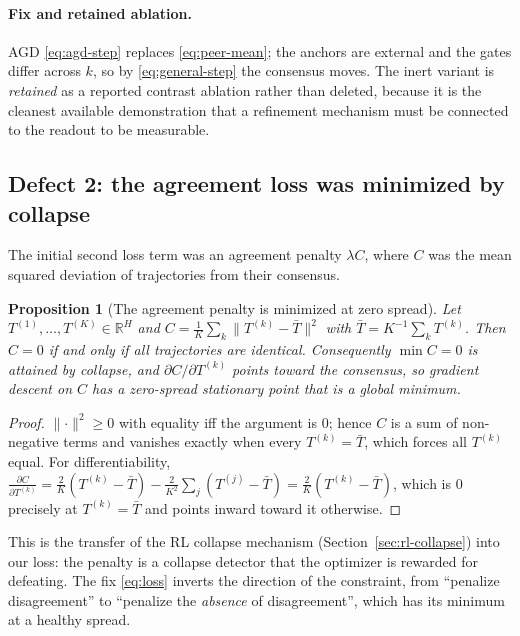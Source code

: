 \documentclass[11pt,a4paper]{article}
\theoremstyle{plain}
\newtheorem{proposition}{Proposition}
\theoremstyle{definition}
\theoremstyle{remark}
\begin{document}
\paragraph{Fix and retained ablation.}
AGD \eqref{eq:agd-step} replaces \eqref{eq:peer-mean}; the anchors are external
and the gates differ across $k$, so by \eqref{eq:general-step} the consensus
moves. The inert variant is \emph{retained} as a reported contrast ablation
rather than deleted, because it is the cleanest available demonstration that
a refinement mechanism must be connected to the readout to be measurable.

\subsection{Defect 2: the agreement loss was minimized by collapse}
\label{sec:defect2}

\noindent
The initial second loss term was an agreement penalty $\lambda C$, where
$C$ was the mean squared deviation of trajectories from their consensus.

\begin{proposition}[The agreement penalty is minimized at zero spread]
\label{prop:agreement-degenerate}
Let $T^{(1)},\dots,T^{(K)} \in \mathbb{R}^H$ and
$C = \frac{1}{K}\sum_k \lVert T^{(k)} - \bar T\rVert^2$ with
$\bar T = K^{-1}\sum_k T^{(k)}$. Then $C = 0$ if and only if all trajectories
are identical. Consequently $\min C = 0$ is attained by collapse, and
$\partial C/\partial T^{(k)}$ points toward the consensus, so gradient
descent on $C$ has a zero-spread stationary point that is a global minimum.
\end{proposition}
\begin{proof}
$\lVert \cdot\rVert^2 \ge 0$ with equality iff the argument is $0$; hence $C$
is a sum of non-negative terms and vanishes exactly when every
$T^{(k)} = \bar T$, which forces all $T^{(k)}$ equal. For differentiability,
$\frac{\partial C}{\partial T^{(k)}} = \frac{2}{K}(T^{(k)} - \bar T) - \frac{2}{K^2}\sum_j (T^{(j)} - \bar T) = \frac{2}{K}(T^{(k)} - \bar T)$, which is $0$ precisely at
$T^{(k)} = \bar T$ and points inward toward it otherwise.
\end{proof}

\noindent
This is the transfer of the RL collapse mechanism
(Section~\ref{sec:rl-collapse}) into our loss: the penalty is a collapse
detector that the optimizer is rewarded for defeating. The fix
\eqref{eq:loss} inverts the direction of the constraint, from ``penalize
disagreement'' to ``penalize the \emph{absence} of disagreement'', which has
its minimum at a healthy spread.
\end{document}
